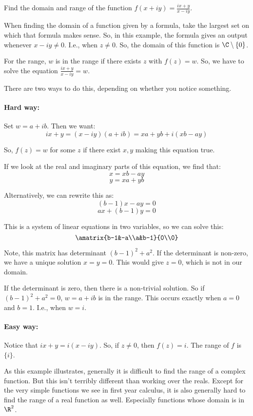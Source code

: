 \begin{ex}{}{} Find the domain and range of the function $f(x + iy) = \frac{ix + y}{x - iy}$.

When finding the domain of a function given by a formula, take the largest set on which that formula makes sense. So, in this example, the formula gives an output whenever $x - iy\ne 0$. I.e., when $z\ne 0$. So, the domain of this function is $\C\setminus\{0\}$.

For the range, $w$ is in the range if there exists $z$ with $f(z) = w$. So, we have to solve the equation $\frac{ix + y}{x-iy} = w$.

There are two ways to do this, depending on whether you notice something.

\paragraph{Hard way:} Set $w = a+ib$. Then we want:
$$ix + y = (x-iy)(a+ib) = xa + yb + i(xb - ay)$$

So, $f(z) = w$ for some $z$ if there exist $x,y$ making this equation true.

If we look at the real and imaginary parts of this equation, we find that:
$$x = xb - ay$$
$$y = xa + yb$$

Alternatively, we can rewrite this as:
$$(b-1)x -ay = 0$$
$$ax +(b-1)y = 0$$

This is a system of linear equations in two variables, so we can solve this:
$$\amatrix{b-1&-a\\a&b-1}{0\\0}$$

Note, this matrix has determinant $(b-1)^2  + a^2$. If the determinant is non-zero, we have a unique solution $x = y = 0$. This would give $z = 0$, which is not in our domain. 

If the determinant is zero, then there is a non-trivial solution. So if $(b-1)^2 +a^2 = 0$, $w = a+ib$ is in the range. This occurs exactly when $a = 0$ and $b = 1$. I.e., when $w = i$.

\paragraph{Easy way:} Notice that $ix + y = i(x - iy)$. So, if $z\ne 0$, then $f(z) = i$. The range of $f$ is $\{i\}$.

\end{ex}

As this example illustrates, generally it is difficult to find the range of a complex function. But this isn't terribly different than working over the reals. Except for the very simple functions we see in first year calculus, it is also generally hard to find the range of a real function as well. Especially functions whose domain is in $\R^2$.

